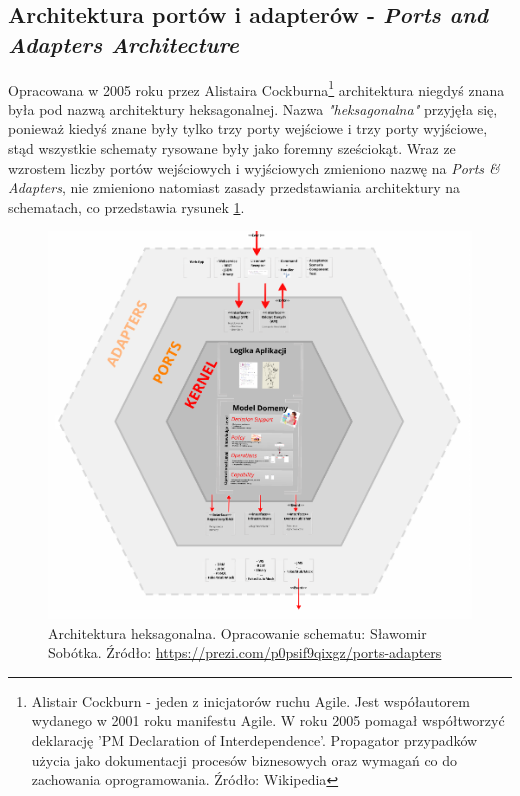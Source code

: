 \subsection{Architektura portów i adapterów - \textit{Ports and Adapters Architecture}}
Opracowana w 2005 roku przez Alistaira Cockburna\footnote{Alistair Cockburn - jeden z inicjatorów ruchu Agile. Jest współautorem wydanego w 2001 roku manifestu Agile. W roku 2005 pomagał współtworzyć deklarację 'PM Declaration of Interdependence'. Propagator przypadków użycia jako dokumentacji procesów biznesowych oraz wymagań co do zachowania oprogramowania. Źródło: Wikipedia} architektura niegdyś znana była pod nazwą architektury heksagonalnej\cite{website:architect:hexagonal}. Nazwa \textit{"heksagonalna"} przyjęła się, ponieważ kiedyś znane były tylko trzy porty wejściowe i trzy porty wyjściowe, stąd wszystkie schematy rysowane były jako foremny sześciokąt. Wraz ze wzrostem liczby portów wejściowych i wyjściowych zmieniono nazwę na \textit{Ports \& Adapters}, nie zmieniono natomiast zasady przedstawiania architektury na schematach, co przedstawia rysunek \ref{fig:hexagonal_architecture}.

\begin{figure}[!htb]
    \centering
    \includegraphics[width=13cm]{imgs/ch4_hexagonal_architecture_2.png}
    \caption
{Architektura heksagonalna. Opracowanie schematu: Sławomir Sobótka. Źródło: \url{https://prezi.com/p0psif9qixgz/ports-adapters}}
    \label{fig:hexagonal_architecture}
\end{figure} 


